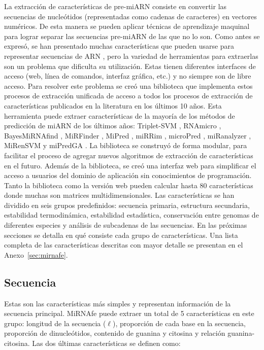 La extracción de características de pre-miARN consiste en convertir las secuencias de nucleótidos (representadas como cadenas de caracteres) en vectores
numéricos. De esta manera se pueden aplicar técnicas de aprendizaje maquinal para lograr separar las secuencias pre-miARN de las que no lo son. Como antes se
expresó, se han presentado muchas características que pueden usarse para representar secuencias de ARN \cite{Lopes2014}, pero la variedad de herramientas
para extraerlas son un problema que dificulta su utilización. Estas tienen diferentes interfaces de acceso (web, línea de comandos, interfaz gráfica, etc.)
y no siempre son de libre acceso. Para resolver este problema se creó una biblioteca que implementa estos procesos de extracción unificada
de acceso a todos los procesos de extracción de características publicados en la literatura en los últimos 10 años. Esta herramienta puede extraer características
de la mayoría de los métodos de predicción de miARN de los últimos años: Triplet-SVM \citep{xue2005classification}, RNAmicro \citep{hertel2006hairpins},
BayesMiRNAfind \citep{yousef2006combining}, MiRFinder \citep{huang2007mirfinder}, MiPred \citep{jiang2007mipred}, miRRim \citep{terai2007mirrim}, microPred
\citep{batuwita2009micropred}, miRanalyzer \citep{hackenberg2009miranalyzer}, MiRenSVM \citep{ding2010mirensvm} y miPredGA \citep{xuan2011genetic}. La
biblioteca se construyó de forma modular, para facilitar el proceso de agregar nuevos algoritmos de extracción de características en el futuro. Además de
la biblioteca, se creó una interfaz web para simplificar el acceso a usuarios del dominio de aplicación sin conocimientos de programación.
Tanto la biblioteca como la versión web pueden calcular hasta 80 características donde muchas son matrices multidimensionales. Las
características se han dividido en seis grupos predefinidos: secuencia primaria, estructura secundaria, estabilidad termodinámica, estabilidad estadística,
conservación entre genomas de diferentes especies y análisis de subcadenas de las secuencias. En las próximas secciones se detalla en qué consiste cada grupo
de características. Una lista completa de las características descritas con mayor detalle se presentan en el Anexo~\ref{sec:mirnafe}.


\subsection{Secuencia}

Estas son las características más simples y representan información de la secuencia principal. MiRNAfe puede extraer un total de 5 características en este
grupo: longitud de la secuencia ($\ell$), proporción de cada base en la secuencia, proporción de dinucleótidos, contenido de guanina y citosina y relación
guanina-citosina. Las dos últimas características se definen como:


